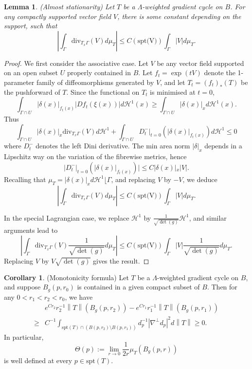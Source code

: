 \documentclass{article}
\newtheorem{lem}[thm]{Lemma}
\theoremstyle{definition}
\newtheorem{cor}[thm]{Corollary}
\newcommand{\norm}[1]{\left\lVert#1\right\rVert}
\begin{document}
	\begin{lem}\label{lem:almoststationary}
		(Almost stationarity)
		Let $T$ be a $\Lambda$-weighted gradient cycle on $B$. For any compactly supported vector field $V$, there is some constant depending on the support, such that
		\[
		|\int_\Gamma  \text{div}_{T_x \Gamma} (V) d\mu_T |\leq C( \text{spt(V)} ) \int_\Gamma |V| d\mu_T.
		\]
	\end{lem}
	
	
	
	
	\begin{proof}
		We first consider the associative case. Let $V$ be any vector field supported on an open subset $U$ properly contained in $B$. Let $f_t=\exp(tV)$ denote the 1-parameter family of diffeomorphisms generated by $V$, and let $T_t=( f_t)_*(T)$ be the pushforward of $T$. Since the functional on $T_t$ is minimised at $t=0$,
		\[
		\int_{ \Gamma\cap U}  |\delta(x)|_{f_t(x)}  |Df_t (\xi(x))| d\mathcal{H}^1(x) \geq 	\int_{ \Gamma\cap U}  |\delta(x)|_{x} d\mathcal{H}^1(x).
		\]
		Thus
		\[
		\int_{ \Gamma\cap U}  |\delta(x)|_x \text{div}_{T_x \Gamma} (V) d\mathcal{H}^1 +  \int_{\Gamma\cap U}   D_t^-|_{t=0} ( |\delta(x)|_{f_t(x)}  ) d\mathcal{H}^1 \leq 0
		\]
		where $D_t^-$ denotes the left Dini derivative. The min area norm $|\delta|_x$ depends in a Lipschitz way on the variation of the fibrewise metrics, hence 
		\[
		| D_t^-|_{t=0} ( |\delta(x)|_{f_t(x)}  ) |\leq  C |\delta(x) |_x  |V|.
		\]
		Recalling that $\mu_T= |\delta(x)|_x d\mathcal{H}^1\lfloor \Gamma$, and replacing $V$ by $-V$, we deduce
		\[
			|\int_\Gamma  \text{div}_{T_x \Gamma} (V) d\mu_T | \leq C( \text{spt(V)} ) \int_\Gamma |V| d\mu_T.
		\]
		
		In the special Lagrangian case, we replace $\mathcal{H}^1$ by $\frac{1}{  \sqrt{ \det(g)  }  }\mathcal{H}^1$, and similar arguments lead to
		\[
			|\int_\Gamma  \text{div}_{T_x \Gamma} (V)  \frac{1}{  \sqrt{ \det(g)  }  }   d\mu_T | \leq C( \text{spt(V)} ) \int_\Gamma    |V|    \frac{1}{  \sqrt{ \det(g)  }  }  d\mu_T.
		\]
		Replacing $V$ by $V \sqrt{ \det(g)  }$ gives the result.
	\end{proof}
	
	
	
	
	
	
	
	\begin{cor}\label{Cor:monotonicitygradientcycle}
		(Monotonicity formula)
	Let $T$ be a $\Lambda$-weighted gradient cycle on $B$, and suppose $B_g(p, r_0)$ is contained in a given compact subset of $B$. Then for any $0<r_1<r_2<r_0$, we have
	\[
	\begin{split}
		&	e^{Cr_2}	r_2^{-1} 	\norm{T}(  B_g(p, r_2)  )- e^{C r_1} r_1^{-1} 	\norm{T}(  B_g(p, r_1)  )
		\\
		\geq &  C^{-1}
		\int_{    \text{spt}(T) \cap (B(p,r_2)\setminus B(p,r_1) ) }  d_p^{-1} |\nabla^\perp d_p|^2  d\norm{ T}  \geq 0.
	\end{split}
	\]
	In particular, 
\[
\Theta(p):= \lim_{r\to 0} \frac{1}{2r}  \mu_T( B_g(p,r)  )
\]
is well defined at every $p\in \text{spt}(T)$.
	\end{cor}
		
\end{document}
